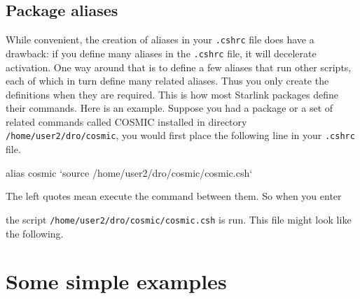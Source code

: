\documentclass[twoside,11pt,nolof]{starlink}
\begin{document}
\subsection{Package aliases\label{sc4_se_package}}

While convenient, the creation of aliases in your \texttt{.cshrc} file
does have a drawback: if you define many aliases in the \texttt{.cshrc}
file, it will decelerate  activation.
One way around that is to define a few aliases that run other scripts,
each of which in turn define many related aliases.  Thus you only
create the definitions when they are required.  This is how most
Starlink packages define their commands.  Here is an example.  Suppose
you had a package or a set of related commands called COSMIC installed
in directory \texttt{/home/user2/dro/cosmic}, you would first place the
following line in your \texttt{.cshrc} file.

\begin{small}
\begin{terminalv}
     alias cosmic `source /home/user2/dro/cosmic/cosmic.csh`
\end{terminalv}
\end{small}
The left quotes mean execute the command between them.  So when you
enter

\begin{small}
\begin{terminalv}
\end{terminalv}
\end{small}
the script \texttt{/home/user2/dro/cosmic/cosmic.csh} is run.  This file
might look like the following.

\begin{small}
\end{small}

\newpage
\section{Some simple examples\label{sc4_se_simple}}
\end{document}
